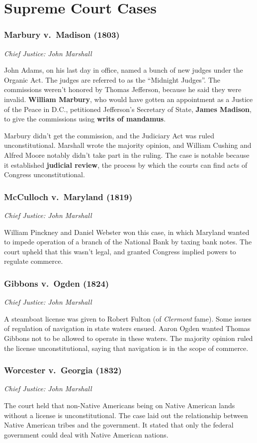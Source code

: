 \chapter{Supreme Court Cases}

\newcommand{\courtcase}[3]{%
  \subsection*{#1 (#2)}%
  \noindent\textit{Chief Justice: #3}%
}

\courtcase{Marbury v.\ Madison}{1803}{John Marshall}

John Adams, on his last day in office, named a bunch of new judges under the Organic Act.
The judges are referred to as the ``Midnight Judges''.
The commissions weren't honored by Thomas Jefferson, because he said they were invalid.
\textbf{William Marbury}, who would have gotten an appointment as a Justice of the Peace in D.C.,
petitioned Jefferson's Secretary of State, \textbf{James Madison},
to give the commissions using \textbf{writs of mandamus}.

Marbury didn't get the commission, and the Judiciary Act was ruled unconstitutional.
Marshall wrote the majority opinion, and William Cushing and Alfred Moore notably didn't take part in the ruling.
The case is notable because it established \textbf{judicial review},
the process by which the courts can find acts of Congress unconstitutional.

\courtcase{McCulloch v.\ Maryland}{1819}{John Marshall}

William Pinckney and Daniel Webster won this case,
in which Maryland wanted to impede operation of a branch of the National Bank by taxing bank notes.
The court upheld that this wasn't legal, and granted Congress implied powers to regulate commerce.

\courtcase{Gibbons v.\ Ogden}{1824}{John Marshall}

A steamboat license was given to Robert Fulton (of \textit{Clermont} fame).
Some issues of regulation of navigation in state waters ensued.
Aaron Ogden wanted Thomas Gibbons not to be allowed to operate in these waters.
The majority opinion ruled the license unconstitutional,
saying that navigation is in the scope of commerce.

\courtcase{Worcester v.\ Georgia}{1832}{John Marshall}

The court held that non-Native Americans being on Native American lands without a license is unconstitutional.
The case laid out the relationship between Native American tribes and the government.
It stated that only the federal government could deal with Native American nations.

